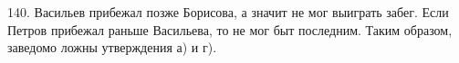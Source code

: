 140. Васильев прибежал позже Борисова, а значит не мог выиграть забег. Если Петров прибежал раньше Васильева, то не мог быт последним. Таким образом, заведомо ложны утверждения а) и г).\\
